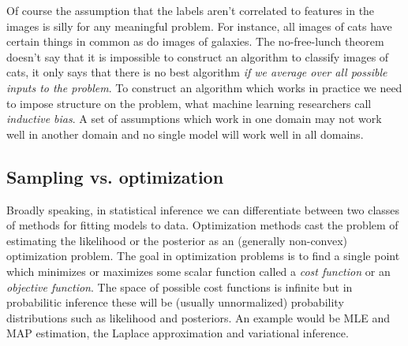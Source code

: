 \documentclass[12pt,dvipsnames]{report}
\renewcommand{\vec}[1]{\boldsymbol{\mathbf{#1}}}
\begin{document}
Of course the assumption that the labels aren't correlated to features in the
images is silly for any meaningful problem. For instance, all images of cats
have certain things in common as do images of galaxies. The no-free-lunch
theorem doesn't say that it is impossible to construct an algorithm to classify
images of cats, it only says that there is no best algorithm \emph{if we
    average over all possible inputs to the problem}. To construct an algorithm
which works in practice we need to impose structure on the problem, what
machine learning researchers call \emph{inductive bias}. A set of assumptions
which work in one domain may not work well in another domain and no single
model will work well in all domains.

\subsection{Sampling vs. optimization}

Broadly speaking, in statistical inference we can differentiate between two
classes of methods for fitting models to data. Optimization methods cast the
problem of estimating the likelihood or the posterior as an (generally
non-convex) optimization problem. The goal in optimization problems is to find
a single point which minimizes or maximizes some scalar function called a
\textsl{cost function} or an \textsl{objective function}. The space of possible
cost functions is infinite but in probabilitic inference these will be (usually
unnormalized) probability distributions such as likelihood and posteriors. An
example would be MLE and MAP estimation, the Laplace approximation and
variational inference.
\end{document}
